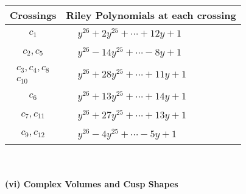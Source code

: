 \documentclass[1p]{elsarticle_modified}
\theoremstyle{definition}
\begin{document}
\begin{tabular}{m{50pt}|m{274pt}}
Crossings & \hspace{64pt}Riley Polynomials at each crossing \\
\hline $$\begin{aligned}c_{1}\end{aligned}$$&$\begin{aligned}
&y^{26}+2 y^{25}+\cdots+12 y+1
\end{aligned}$\\
\hline $$\begin{aligned}c_{2},c_{5}\end{aligned}$$&$\begin{aligned}
&y^{26}-14 y^{25}+\cdots-8 y+1
\end{aligned}$\\
\hline $$\begin{aligned}c_{3},c_{4},c_{8}\\c_{10}\end{aligned}$$&$\begin{aligned}
&y^{26}+28 y^{25}+\cdots+11 y+1
\end{aligned}$\\
\hline $$\begin{aligned}c_{6}\end{aligned}$$&$\begin{aligned}
&y^{26}+13 y^{25}+\cdots+14 y+1
\end{aligned}$\\
\hline $$\begin{aligned}c_{7},c_{11}\end{aligned}$$&$\begin{aligned}
&y^{26}+27 y^{25}+\cdots+13 y+1
\end{aligned}$\\
\hline $$\begin{aligned}c_{9},c_{12}\end{aligned}$$&$\begin{aligned}
&y^{26}-4 y^{25}+\cdots-5 y+1
\end{aligned}$\\
\hline
\end{tabular}\\~\\
\newpage\flushleft \textbf{(vi) Complex Volumes and Cusp Shapes}
\end{document}

